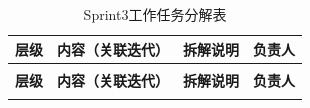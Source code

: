 \begin{enumerate}
\begin{longtable}{>{\centering\arraybackslash}m{2cm} >{\centering\arraybackslash}m{5cm} >{\centering\arraybackslash}m{5cm} >{\centering\arraybackslash}m{1.5cm}}
              \caption{Sprint3工作任务分解表} \label{tab:training}                                                                         \\

              \toprule
              \textbf{层级}        & \textbf{内容（关联迭代）}                   & \textbf{拆解说明}                               & \textbf{负责人} \\
              \midrule
              \endfirsthead

              \multicolumn{4}{c}{{\tablename\ \thetable{} 续表}}                                                                      \\
              \toprule
              \textbf{层级}        & \textbf{内容（关联迭代）}                   & \textbf{拆解说明}                               & \textbf{负责人} \\
              \midrule
              \endhead

              \bottomrule
              \endfoot


\end{longtable}
\end{enumerate}
